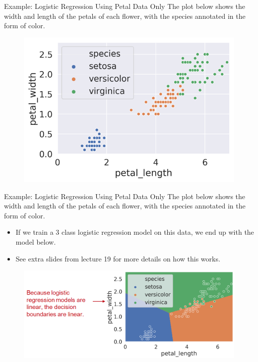 \documentclass[aspectratio=169]{../latex_main/tntbeamer}  %
\begin{document}
		\begin{frame}{Example: Logistic Regression Using Petal Data Only}
	    The plot below shows the width and length of the petals of each flower, with the species annotated in the form of color.
	    \begin{figure}
	        \centering
	        \includegraphics[scale=.75]{Bild3}
	    \end{figure}
	\end{frame}
	
	\begin{frame}{Example: Logistic Regression Using Petal Data Only}
	    The plot below shows the width and length of the petals of each flower, with the species annotated in the form of color.
	    \begin{itemize}
	        \item If we train a 3 class logistic regression model on this data, we end up with the model below.
	        \item See extra slides from lecture 19 for more details on how this works.
	    \end{itemize}
	    \begin{figure}
	        \centering
	        \includegraphics[scale=.4]{Bild4}
	    \end{figure}
	\end{frame}
	
\end{document}
